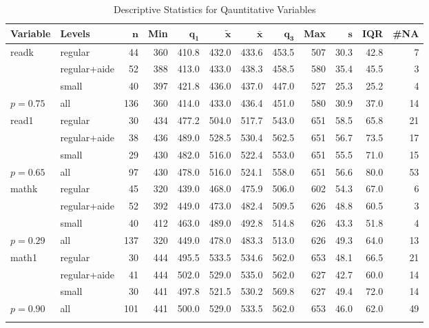 \documentclass[doc]{apa6}\usepackage[]{graphicx}\usepackage[]{color}
\begin{document}
\begin{landscape}
\clearpage
{\footnotesize
\begin{longtable}{llrrrrrrrrrr}
 \textbf{Variable} & \textbf{Levels} & $\mathbf{n}$ & \textbf{Min} & $\mathbf{q_1}$ & $\mathbf{\widetilde{x}}$ & $\mathbf{\bar{x}}$ & $\mathbf{q_3}$ & \textbf{Max} & $\mathbf{s}$ & \textbf{IQR} & \textbf{\#NA} \\ 
  \hline
readk & regular &  44 & 360 & 410.8 & 432.0 & 433.6 & 453.5 & 507 & 30.3 & 42.8 &  7 \\ 
   & regular+aide &  52 & 388 & 413.0 & 433.0 & 438.3 & 458.5 & 580 & 35.4 & 45.5 &  3 \\ 
   & small &  40 & 397 & 421.8 & 436.0 & 437.0 & 447.0 & 527 & 25.3 & 25.2 &  4 \\ 
   \hline
$p= 0.75$ & all & 136 & 360 & 414.0 & 433.0 & 436.4 & 451.0 & 580 & 30.9 & 37.0 & 14 \\ 
   \hline
read1 & regular &  30 & 434 & 477.2 & 504.0 & 517.7 & 543.0 & 651 & 58.5 & 65.8 & 21 \\ 
   & regular+aide &  38 & 436 & 489.0 & 528.5 & 530.4 & 562.5 & 651 & 56.7 & 73.5 & 17 \\ 
   & small &  29 & 430 & 482.0 & 516.0 & 522.4 & 553.0 & 651 & 55.5 & 71.0 & 15 \\ 
   \hline
$p= 0.65$ & all &  97 & 430 & 478.0 & 516.0 & 524.1 & 558.0 & 651 & 56.6 & 80.0 & 53 \\ 
   \hline
mathk & regular &  45 & 320 & 439.0 & 468.0 & 475.9 & 506.0 & 602 & 54.3 & 67.0 &  6 \\ 
   & regular+aide &  52 & 392 & 449.0 & 473.0 & 482.4 & 509.5 & 626 & 48.8 & 60.5 &  3 \\ 
   & small &  40 & 412 & 463.0 & 489.0 & 492.8 & 514.8 & 626 & 43.3 & 51.8 &  4 \\ 
   \hline
$p= 0.29$ & all & 137 & 320 & 449.0 & 478.0 & 483.3 & 513.0 & 626 & 49.3 & 64.0 & 13 \\ 
   \hline
math1 & regular &  30 & 444 & 495.5 & 533.5 & 534.6 & 562.0 & 653 & 48.1 & 66.5 & 21 \\ 
   & regular+aide &  41 & 444 & 502.0 & 529.0 & 535.0 & 562.0 & 627 & 42.7 & 60.0 & 14 \\ 
   & small &  30 & 441 & 497.8 & 521.5 & 530.2 & 569.8 & 627 & 49.4 & 72.0 & 14 \\ 
   \hline
$p= 0.90$ & all & 101 & 441 & 500.0 & 529.0 & 533.5 & 562.0 & 653 & 46.0 & 62.0 & 49 \\ 
   \hline
\hline
\caption{Descriptive Statistics for Qauntitative Variables} 
\label{}
\end{longtable}
}


\end{landscape}
\clearpage
\end{document}
